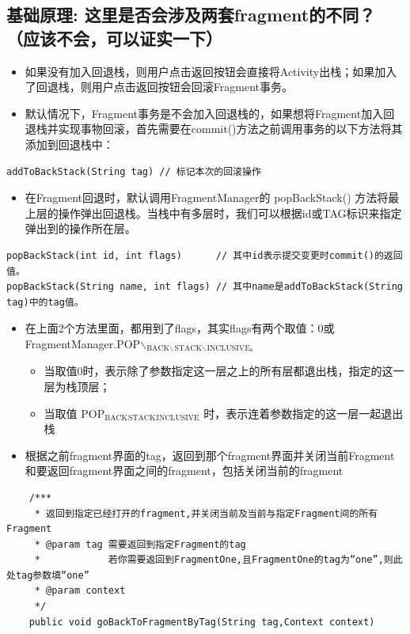 \documentclass[9pt, b5paaper]{book}
\begin{document}
\subsection{基础原理: 这里是否会涉及两套fragment的不同？（应该不会，可以证实一下）}
\label{sec-2-11-2}
\begin{itemize}
\item 如果没有加入回退栈，则用户点击返回按钮会直接将Activity出栈；如果加入了回退栈，则用户点击返回按钮会回滚Fragment事务。
\item 默认情况下，Fragment事务是不会加入回退栈的，如果想将Fragment加入回退栈并实现事物回滚，首先需要在commit()方法之前调用事务的以下方法将其添加到回退栈中：
\end{itemize}
\begin{verbatim}
addToBackStack(String tag) // 标记本次的回滚操作
\end{verbatim}
\begin{itemize}
\item 在Fragment回退时，默认调用FragmentManager的 popBackStack() 方法将最上层的操作弹出回退栈。当栈中有多层时，我们可以根据id或TAG标识来指定弹出到的操作所在层。
\end{itemize}
\begin{verbatim}
popBackStack(int id, int flags)      // 其中id表示提交变更时commit()的返回值。
popBackStack(String name, int flags) // 其中name是addToBackStack(String tag)中的tag值。
\end{verbatim}
\begin{itemize}
\item 在上面2个方法里面，都用到了flags，其实flags有两个取值：0或FragmentManager.POP$\backslash$$_{\text{BACK$\backslash$}}$$_{\text{STACK$\backslash$}}$$_{\text{INCLUSIVE。}}$
\begin{itemize}
\item 当取值0时，表示除了参数指定这一层之上的所有层都退出栈，指定的这一层为栈顶层；
\item 当取值 POP$_{\text{BACK}}$$_{\text{STACK}}$$_{\text{INCLUSIVE}}$ 时，表示连着参数指定的这一层一起退出栈
\end{itemize}
\item 根据之前fragment界面的tag，返回到那个fragment界面并关闭当前Fragment和要返回fragment界面之间的fragment，包括关闭当前的fragment
\end{itemize}
\begin{verbatim}
    /***
     * 返回到指定已经打开的fragment,并关闭当前及当前与指定Fragment间的所有Fragment
     * @param tag 需要返回到指定Fragment的tag
     *            若你需要返回到FragmentOne,且FragmentOne的tag为“one”,则此处tag参数填“one”
     * @param context
     */
    public void goBackToFragmentByTag(String tag,Context context)
\end{verbatim}
\end{document}
